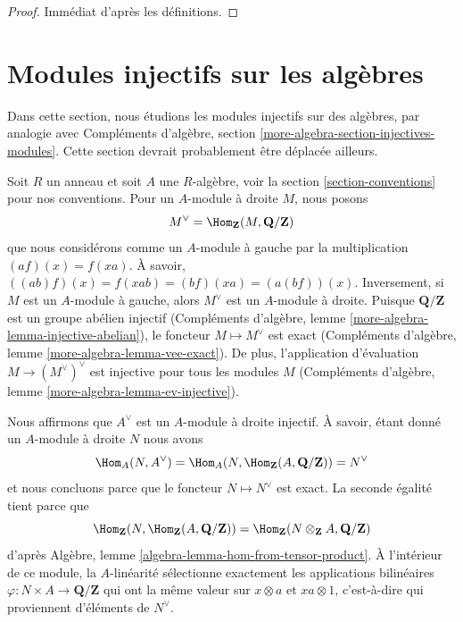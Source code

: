 \begin{proof}
Immédiat d'après les définitions.
\end{proof}







\section{Modules injectifs sur les algèbres}
\label{section-modules-noncommutative}

\noindent
Dans cette section, nous étudions les modules injectifs sur des
algèbres, par
analogie avec Compléments d'algèbre, section
\ref{more-algebra-section-injectives-modules}. Cette section devrait probablement être déplacée ailleurs.

\medskip\noindent
Soit $R$ un anneau et soit $A$ une
$R$-algèbre, voir la section \ref{section-conventions} pour nos conventions. Pour un
$A$-module à droite $M$, nous posons
$$
M^\vee = \Hom_\mathbf{Z}(M, \mathbf{Q}/\mathbf{Z})
$$
que nous considérons comme un $A$-module à gauche par la
multiplication $(a f)(x) = f(xa)$. À savoir, $((ab)f)(x) = f(xab) = (bf)(xa) = (a(bf))(x)$.
Inversement, si $M$ est un $A$-module à gauche, alors $M^\vee$ est un
$A$-module à droite. Puisque $\mathbf{Q}/\mathbf{Z}$ est un groupe abélien
injectif (Compléments d'algèbre, lemme \ref{more-algebra-lemma-injective-abelian}), le
foncteur $M \mapsto M^\vee$ est exact
(Compléments d'algèbre, lemme \ref{more-algebra-lemma-vee-exact}). De plus,
l'application d'évaluation $M \to (M^\vee)^\vee$ est
injective pour tous les modules $M$
(Compléments d'algèbre, lemme \ref{more-algebra-lemma-ev-injective}).

\medskip\noindent
Nous affirmons que $A^\vee$ est un $A$-module à droite injectif. À savoir, étant donné
un $A$-module à droite $N$ nous avons
$$
\Hom_A(N, A^\vee) =
\Hom_A(N, \Hom_\mathbf{Z}(A, \mathbf{Q}/\mathbf{Z})) = N^\vee
$$
et nous concluons parce que le foncteur $N \mapsto N^\vee$ est
exact. La seconde égalité tient parce que
$$
\Hom_\mathbf{Z}(N, \Hom_\mathbf{Z}(A, \mathbf{Q}/\mathbf{Z})) =
\Hom_\mathbf{Z}(N \otimes_\mathbf{Z} A, \mathbf{Q}/\mathbf{Z})
$$
d'après Algèbre, lemme \ref{algebra-lemma-hom-from-tensor-product}. À
l'intérieur de ce module, la $A$-linéarité sélectionne exactement les applications
bilinéaires $\varphi : N \times A \to \mathbf{Q}/\mathbf{Z}$ qui
ont la même valeur sur $x \otimes a$ et $xa \otimes 1$, c'est-à-dire qui
proviennent d'éléments de $N^\vee$.

